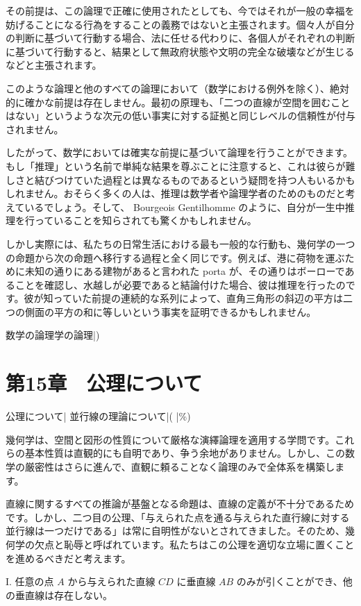 \documentclass[a4paper,11pt,openany]{ltjsbook}
\begin{document}
その前提は、この論理で正確に使用されたとしても、今ではそれが一般の幸福を妨げることになる行為をすることの義務ではないと主張されます。個々人が自分の判断に基づいて行動する場合、法に任せる代わりに、各個人がそれぞれの判断に基づいて行動すると、結果として無政府状態や文明の完全な破壊などが生じるなどと主張されます。

このような論理と他のすべての論理において（数学における例外を除く）、絶対的に確かな前提は存在しません。最初の原理も、「二つの直線が空間を囲むことはない」というような次元の低い事実に対する証拠と同じレベルの信頼性が付与されません。

したがって、数学においては確実な前提に基づいて論理を行うことができます。もし「推理」という名前で単純な結果を尊ぶことに注意すると、これは彼らが難しさと結びつけていた過程とは異なるものであるという疑問を持つ人もいるかもしれません。おそらく多くの人は、推理は数学者や論理学者のためのものだと考えているでしょう。そして、 Bourgeois Gentilhomme のように、自分が一生中推理を行っていることを知らされても驚くかもしれません。

しかし実際には、私たちの日常生活における最も一般的な行動も、幾何学の一つの命題から次の命題へ移行する過程と全く同じです。例えば、港に荷物を運ぶために未知の通りにある建物があると言われた porta が、その通りはボーローであることを確認し、水越しが必要であると結論付けた場合、彼は推理を行ったのです。彼が知っていた前提の連続的な系列によって、直角三角形の斜辺の平方は二つの側面の平方の和に等しいという事実を証明できるかもしれません。

数学の論理学の論理|)

\chapter{第15章　公理について}

公理について|
並行線の理論について|( |\%)

幾何学は、空間と図形の性質について厳格な演繹論理を適用する学問です。これらの基本性質は直観的にも自明であり、争う余地がありません。しかし、この数学の厳密性はさらに進んで、直観に頼ることなく論理のみで全体系を構築します。

直線に関するすべての推論が基盤となる命題は、直線の定義が不十分であるためです。しかし、二つ目の公理、「与えられた点を通る与えられた直行線に対する並行線は一つだけである」は常に自明性がないとされてきました。そのため、幾何学の欠点と恥辱と呼ばれています。私たちはこの公理を適切な立場に置くことを進めるべきだと考えます。


I. 任意の点 \( A \) から与えられた直線 \( CD \) に垂直線 \( AB \) のみが引くことができ、他の垂直線は存在しない。
\end{document}
